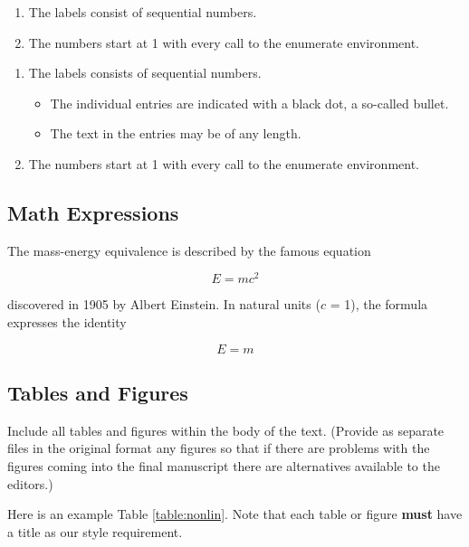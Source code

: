 \documentclass{article}
\begin{document}
\begin{enumerate}[noitemsep]
  \item The labels consist of sequential numbers.
  \item The numbers start at 1 with every call to the enumerate environment.
\end{enumerate}

\begin{enumerate}[noitemsep]
   \item The labels consists of sequential numbers.
   \begin{itemize}[noitemsep]
     \item The individual entries are indicated with a black dot, a so-called bullet.
     \item The text in the entries may be of any length.
   \end{itemize}
   \item The numbers start at 1 with every call to the enumerate environment.
\end{enumerate}

\subsection{Math Expressions}
The mass-energy equivalence is described by the famous equation

$$E=mc^2$$

discovered in 1905 by Albert Einstein.
In natural units ($c$ = 1), the formula expresses the identity

\begin{equation}
E=m
\end{equation}

\subsection{Tables and Figures}
Include all tables and figures within the body of the text. (Provide as separate
files in the original format any figures so that if there are problems with the
figures coming into the final manuscript there are alternatives available to the editors.)

Here is an example Table \ref{table:nonlin}. Note that each table or figure \textbf{must} have
a title as our style requirement.
\end{document}
